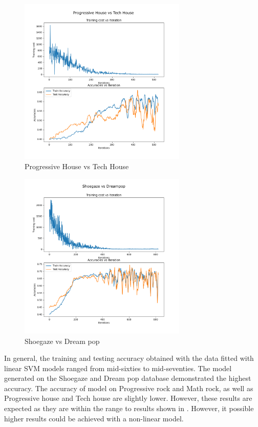 \documentclass[letterpaper, 12 pt, conference]{ieeeconf}  %
\begin{document}
\begin{figure}
\includegraphics[width=8cm]{phth_svm.png}
\caption{Progressive House vs Tech House}
\end{figure}
\begin{figure}
\includegraphics[width=8cm]{sgdp_svm.png}
\caption{Shoegaze vs Dream pop}
\end{figure}

\par In general, the training and testing accuracy obtained with the data fitted with linear SVM models ranged from mid-sixties to mid-seventies. The model generated on the Shoegaze and Dream pop database demonstrated the highest accuracy. The accuracy of model on Progressive rock and Math rock, as well as Progressive house and Tech house are slightly lower. However, these results are expected as they are within the range to results shown in \cite{c7}. However, it possible higher results could be achieved with a non-linear model. 

\newline \,\,
\end{document}
